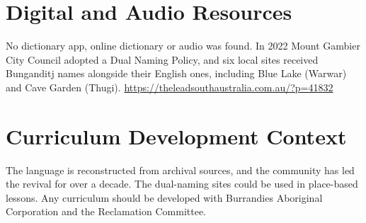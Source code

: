 \documentclass[12pt]{article}
\begin{document}
\section{Digital and Audio Resources}
No dictionary app, online dictionary or audio was found. In 2022 Mount Gambier City Council adopted a Dual Naming Policy, and six local sites received Bunganditj names alongside their English ones, including Blue Lake (Warwar) and Cave Garden (Thugi). \url{https://theleadsouthaustralia.com.au/?p=41832}

\section{Curriculum Development Context}
The language is reconstructed from archival sources, and the community has led the revival for over a decade. The dual-naming sites could be used in place-based lessons. Any curriculum should be developed with Burrandies Aboriginal Corporation and the Reclamation Committee.
\end{document}
